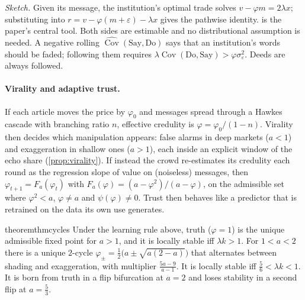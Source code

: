 \documentclass{article}
\theoremstyle{plain}
\theoremstyle{definition}
\theoremstyle{remark}
\DeclareMathOperator{\Cov}{Cov}
\begin{document}
\emph{Sketch.} Given its message, the institution's optimal trade solves $v-\varphi m=2\lambda x$; substituting into $r=v-\varphi(m+\varepsilon)-\lambda x$ gives the pathwise identity.  is the paper's central tool. Both sides are estimable and no distributional assumption is needed. A negative rolling $\widehat{\Cov}(\text{Say},\text{Do})$ says that an institution's words should be faded; following them requires $\lambda\Cov(\text{Do},\text{Say})>\varphi\sigma_\varepsilon^2$. Deeds are always followed.

\paragraph{Virality and adaptive trust.} If each article moves the price by $\varphi_0$ and messages spread through a Hawkes cascade with branching ratio $n$, effective credulity is $\varphi=\varphi_0/(1-n)$. Virality then decides which manipulation appears: false alarms in deep markets ($a<1$) and exaggeration in shallow ones ($a>1$), each inside an explicit window of the echo share (\cref{prop:virality}). If instead the crowd re-estimates its credulity each round as the regression slope of value on (noiseless) messages, then $\varphi_{t+1}=F_a(\varphi_t)$ with $F_a(\varphi)=(a-\varphi^2)/(a-\varphi)$, on the admissible set where $\varphi^2<a$, $\varphi\neq a$ and $\psi(\varphi)\neq0$. Trust then behaves like a predictor that is retrained on the data its own use generates.

\begin{restatable}{theorem}{thmcycles}\label{thm:cycles}
Under the learning rule above, truth ($\varphi=1$) is the unique admissible fixed point for $a>1$, and it is locally stable iff $\lambda k>1$. For $1<a<2$ there is a unique $2$-cycle $\varphi_\pm=\frac12\big(a\pm\sqrt{a(2-a)}\big)$ that alternates between shading and exaggeration, with multiplier $\frac{5a-9}{a-1}$. It is locally stable iff $\frac56<\lambda k<1$. It is born from truth in a flip bifurcation at $a=2$ and loses stability in a second flip at $a=\frac53$.
\end{restatable}
\end{document}

